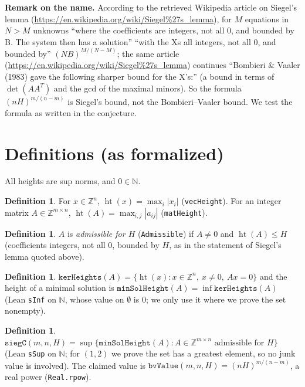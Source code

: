 \documentclass[11pt]{article}
\theoremstyle{definition}
\newtheorem{definition}[theorem]{Definition}
\newcommand{\hgt}{\operatorname{ht}}
\begin{document}
\textbf{Remark on the name.} According to the retrieved Wikipedia article on Siegel's lemma
(\url{https://en.wikipedia.org/wiki/Siegel%27s_lemma}), for $M$ equations in $N>M$ unknowns
``where the coefficients are integers, not all 0, and bounded by B. The system then has a
solution'' ``with the Xs all integers, not all 0, and bounded by'' $(NB)^{M/(N-M)}$; the same
article (\url{https://en.wikipedia.org/wiki/Siegel%27s_lemma}) continues
``Bombieri \& Vaaler (1983) gave the following sharper bound for the X's:'' (a bound in
terms of $\det(AA^T)$ and the gcd of the maximal minors). So the formula $(nH)^{m/(n-m)}$ is
Siegel's bound, not the Bombieri--Vaaler bound. We test the formula as written in the
conjecture.

\section{Definitions (as formalized)}

All heights are sup norms, and $0\in\mathbb{N}$.

\begin{definition}
For $x\in\mathbb{Z}^n$, $\hgt(x)=\max_i |x_i|$ (\texttt{vecHeight}). For an integer matrix
$A\in\mathbb{Z}^{m\times n}$, $\hgt(A)=\max_{i,j}|a_{ij}|$ (\texttt{matHeight}).
\end{definition}

\begin{definition}
$A$ is \emph{admissible for $H$} (\texttt{Admissible}) if $A\neq 0$ and $\hgt(A)\le H$
(coefficients integers, not all $0$, bounded by $H$, as in the statement of Siegel's lemma quoted
above).
\end{definition}

\begin{definition}
$\texttt{kerHeights}(A)=\{\hgt(x) : x\in\mathbb{Z}^n,\ x\neq 0,\ Ax=0\}$ and the height of a minimal
solution is $\texttt{minSolHeight}(A)=\inf \texttt{kerHeights}(A)$ (Lean \texttt{sInf} on
$\mathbb{N}$, whose value on $\emptyset$ is $0$; we only use it where we prove the set nonempty).
\end{definition}

\begin{definition}
$\texttt{siegC}(m,n,H)=\sup\{\texttt{minSolHeight}(A) : A\in\mathbb{Z}^{m\times n}\text{ admissible
for }H\}$ (Lean \texttt{sSup} on $\mathbb{N}$; for $(1,2)$ we prove the set has a greatest
element, so no junk value is involved). The claimed value is
$\texttt{bvValue}(m,n,H)=(nH)^{m/(n-m)}$, a real power (\texttt{Real.rpow}).
\end{definition}
\end{document}
